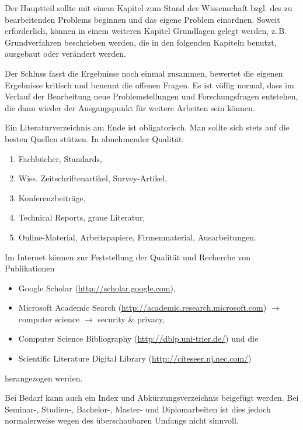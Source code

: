 \documentclass[
    12pt,
    headings=small,
    parskip=half,           %
    bibliography=totoc,
    numbers=noenddot,       %
    open=any,               %
    ]{scrreprt}
\begin{document}
Der Hauptteil sollte mit einem Kapitel zum Stand der Wissenschaft bzgl. des zu bearbeitenden Problems beginnen und das eigene Problem einordnen. Soweit erforderlich, können in einem weiteren Kapitel Grundlagen gelegt werden, z.\,B. Grundverfahren beschrieben werden, die in den folgenden Kapiteln benutzt, ausgebaut oder verändert werden.

Der Schluss fasst die Ergebnisse noch einmal zusammen, bewertet die eigenen Ergebnisse kritisch und benennt die offenen Fragen. Es ist völlig normal, dass im Verlauf der Bearbeitung neue Problemstellungen und Forschungsfragen entstehen, die dann wieder der Ausgangspunkt für weitere Arbeiten sein können.

Ein Literaturverzeichnis am Ende ist obligatorisch. Man sollte sich stets auf die besten Quellen stützen. In abnehmender Qualität:

\begin{enumerate}
	\item Fachbücher, Standards,
	\item Wiss. Zeitschriftenartikel, Survey-Artikel,
	\item Konferenzbeiträge,
	\item Technical Reports, graue Literatur,
	\item Online-Material, Arbeitspapiere, Firmenmaterial, Ausarbeitungen.
\end{enumerate}

Im Internet können zur Feststellung der Qualität und Recherche von Publikationen

\begin{itemize}
	\item Google Scholar (\url{http://scholar.google.com}),
	\item Microsoft Academic Search (\href{http://academic.research.microsoft.com/?SearchDomain=2&SubDomain=2&entitytype=2}{http://academic.research.microsoft.com}) $\to$ computer science $\to$ security \& privacy,
	\item Computer Science Bibliography (\url{http://dblp.uni-trier.de/}) und die
	\item Scientific Literature Digital Library (\url{http://citeseer.nj.nec.com/})
\end{itemize}

herangezogen werden.

Bei Bedarf kann auch ein Index und Abkürzungsverzeichnis beigefügt werden. Bei Seminar-, Studien-, Bachelor-, Master- und Diplomarbeiten ist dies jedoch normalerweise wegen des überschaubaren Umfangs nicht sinnvoll.
\end{document}
